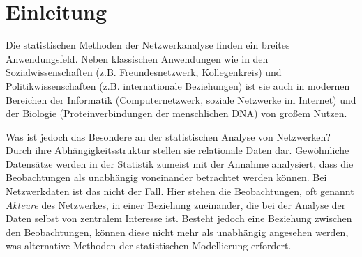 \documentclass[a4paper,ngerman,oneside,titlepage,bibliography=totoc,11pt]{scrreprt}
\begin{document}
\begin{abstract}


\begin{center}
{\it \bf Abstract} 
\end{center}

\noindent
Die \emph{NISAT Database} des \emph{Peace Research Institute Oslo (PRIO)} enthält Daten über den internationalen Handel mit Kleinwaffen und Leichtwaffen von insgesamt 239 verschiedenen Ländern im Zeitraum von 1992 bis 2011. Diese wurden mit neuen Methoden der statistischen Netzwerkanalyse untersucht.\\

\noindent
Im Rahmen des Projekts wurde zunächst eine deskriptive Analyse durchgeführt, die unter anderem zentrale Akteure des Netzwerkes identifizieren konnte. Ein besonderes Augenmerk galt hier der Veränderung der Netzwerkstrukturen über die Zeit. Anschließend wurde mit Hilfe zusätzlicher Kovariablen versucht, ein \emph{Exponential Random Graph Model (ERGM)} auf die Netzwerkdaten der einzelnen Jahre anzupassen. Die Ergebnisse der Modellierung wurden abschließend mit denen eines vorhergehenden Projekts über den Handel mit Großwaffen verglichen.
 


\end{abstract}




\tableofcontents




\chapter{Einleitung}
Die statistischen Methoden der Netzwerkanalyse finden ein breites Anwendungsfeld. Neben klassischen Anwendungen wie in den Sozialwissenschaften (z.B. Freundesnetzwerk, Kollegenkreis)  und Politikwissenschaften (z.B. internationale Beziehungen) ist sie auch in modernen Bereichen der Informatik (Computernetzwerk, soziale Netzwerke im Internet) und der Biologie (Proteinverbindungen der menschlichen DNA) von großem Nutzen.

Was ist jedoch das Besondere an der statistischen Analyse von Netzwerken? Durch ihre Abhängigkeitsstruktur stellen sie relationale Daten dar. Gewöhnliche Datensätze werden in der Statistik zumeist mit der Annahme analysiert, dass die Beobachtungen als unabhängig voneinander betrachtet werden können. Bei Netzwerkdaten ist das nicht der Fall. Hier stehen die Beobachtungen, oft genannt \emph{Akteure} des Netzwerkes, in einer Beziehung zueinander, die bei der Analyse der Daten  selbst von zentralem Interesse ist. Besteht jedoch eine Beziehung zwischen den Beobachtungen, können diese nicht mehr als unabhängig angesehen werden, was alternative Methoden der statistischen Modellierung erfordert. 
\end{document}
